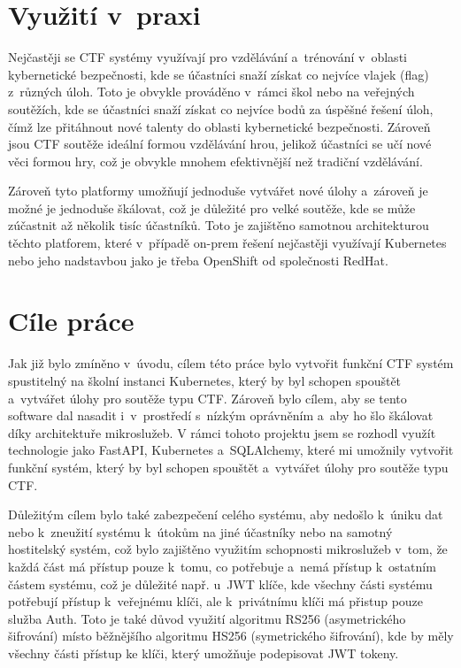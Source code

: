 \documentclass[12pt, a4paper,
oneside,      %
openright
]{report}
\begin{document}
\section{Využití v~praxi}
Nejčastěji se CTF systémy využívají pro vzdělávání a~trénování v~oblasti kybernetické bezpečnosti, kde se účastníci snaží získat co nejvíce vlajek (flag) z~různých úloh. Toto je obvykle prováděno v~rámci škol nebo na veřejných soutěžích, kde se účastníci snaží získat co nejvíce bodů za úspěšné řešení úloh, čímž lze přitáhnout nové talenty do oblasti kybernetické bezpečnosti. Zároveň jsou CTF soutěže ideální formou vzdělávání hrou, jelikož účastníci se učí nové věci formou hry, což je obvykle mnohem efektivnější než tradiční vzdělávání.

Zároveň tyto platformy umožňují jednoduše vytvářet nové úlohy a~zároveň je možné je jednoduše škálovat, což je důležité pro velké soutěže, kde se může zúčastnit až několik tisíc účastníků. Toto je zajištěno samotnou architekturou těchto platforem, které v~případě on-prem řešení nejčastěji využívají Kubernetes nebo jeho nadstavbou jako je třeba OpenShift od společnosti RedHat.

\section{Cíle práce}
Jak již bylo zmíněno v~úvodu, cílem této práce bylo vytvořit funkční CTF systém spustitelný na školní instanci Kubernetes, který by byl schopen spouštět a~vytvářet úlohy pro soutěže typu CTF. Zároveň bylo cílem, aby se tento software dal nasadit i~v~prostředí s~nízkým oprávněním a~aby ho šlo škálovat díky architektuře mikroslužeb. V rámci tohoto projektu jsem se rozhodl využít technologie jako FastAPI, Kubernetes a~SQLAlchemy, které mi umožnily vytvořit funkční systém, který by byl schopen spouštět a~vytvářet úlohy pro soutěže typu CTF. 

Důležitým cílem bylo také zabezpečení celého systému, aby nedošlo k~úniku dat nebo k~zneužití systému k~útokům na jiné účastníky nebo na samotný hostitelský systém, což bylo zajištěno využitím schopnosti mikroslužeb v~tom, že každá část má přístup pouze k~tomu, co potřebuje a~nemá přístup k~ostatním částem systému, což je důležité např. u~JWT klíče, kde všechny části systému potřebují přístup k~veřejnému klíči, ale k~privátnímu klíči má přistup pouze služba Auth. Toto je také důvod využití algoritmu RS256 (asymetrického šifrování) místo běžnějšího algoritmu HS256 (symetrického šifrování), kde by měly všechny části přístup ke klíči, který umožňuje podepisovat JWT tokeny.
\end{document}

